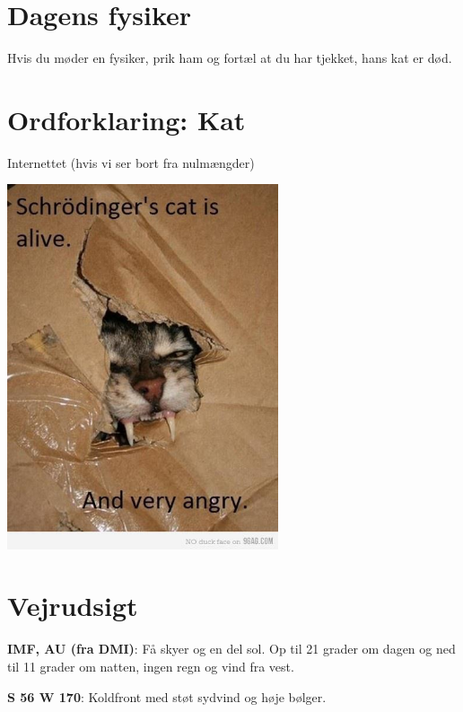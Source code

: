 

\begin{minipage}[b]{0.95\linewidth}
\begin{minipage}[t]{0.47\textwidth}
\vspace{3mm}
\section*{Dagens fysiker}
Hvis du møder en fysiker, prik ham og fortæl at du har tjekket, hans kat er død.

\section*{Ordforklaring: Kat}
Internettet (hvis vi ser bort fra nulmængder)

\begin{center}
\includegraphics[width=0.6\textwidth]{catisangry.jpg}
\end{center}

\end{minipage}%
\hfill\begin{minipage}[t]{0.47\textwidth}
\vspace{3mm}
\section*{Vejrudsigt}
\textbf{IMF, AU (fra DMI)}: Få skyer og en del sol. Op til 21 grader om dagen og ned til 11 grader om natten, ingen regn og vind fra vest.

\textbf{S 56 W 170}: Koldfront med støt sydvind og høje bølger.


\end{minipage}
\end{minipage}

